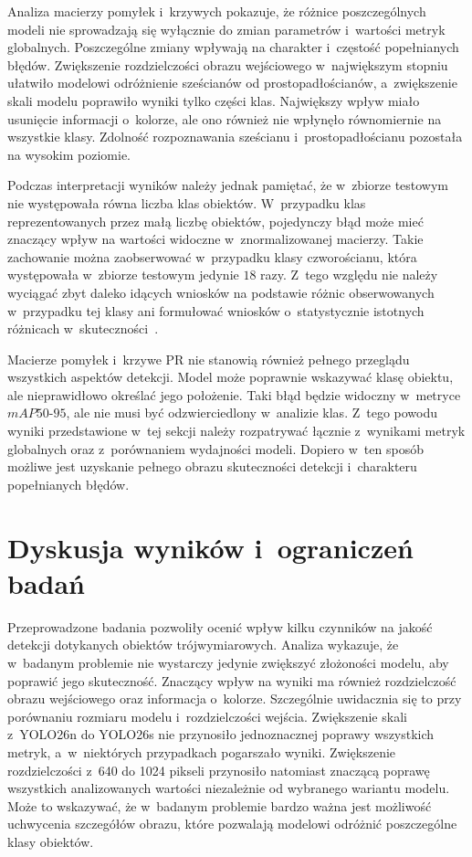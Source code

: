 Analiza macierzy pomyłek i~krzywych pokazuje, że różnice poszczególnych modeli nie sprowadzają się wyłącznie do zmian parametrów i~wartości metryk globalnych. Poszczególne zmiany wpływają na charakter i~częstość popełnianych błędów. Zwiększenie rozdzielczości obrazu wejściowego w~największym stopniu ułatwiło modelowi odróżnienie sześcianów od prostopadłościanów, a~zwiększenie skali modelu poprawiło wyniki tylko części klas. Największy wpływ miało usunięcie informacji o~kolorze, ale ono również nie wpłynęło równomiernie na wszystkie klasy. Zdolność rozpoznawania sześcianu i~prostopadłościanu pozostała na wysokim poziomie.

Podczas interpretacji wyników należy jednak pamiętać, że w~zbiorze testowym nie występowała równa liczba klas obiektów. W~przypadku klas reprezentowanych przez małą liczbę obiektów, pojedynczy błąd może mieć znaczący wpływ na wartości widoczne w~znormalizowanej macierzy. Takie zachowanie można zaobserwować w~przypadku klasy czworościanu, która występowała w~zbiorze testowym jedynie $18$ razy. Z~tego względu nie należy wyciągać zbyt daleko idących wniosków na podstawie różnic obserwowanych w~przypadku tej klasy ani formułować wniosków o~statystycznie istotnych różnicach w~skuteczności~.

Macierze pomyłek i~krzywe PR nie stanowią również pełnego przeglądu wszystkich aspektów detekcji. Model może poprawnie wskazywać klasę obiektu, ale nieprawidłowo określać jego położenie. Taki błąd będzie widoczny w~metryce $mAP50\text{-}95$, ale nie musi być odzwierciedlony w~analizie klas. Z~tego powodu wyniki przedstawione w~tej sekcji należy rozpatrywać łącznie z~wynikami metryk globalnych oraz z~porównaniem wydajności modeli. Dopiero w~ten sposób możliwe jest uzyskanie pełnego obrazu skuteczności detekcji i~charakteru popełnianych błędów.

\section{Dyskusja wyników i~ograniczeń badań}

Przeprowadzone badania pozwoliły ocenić wpływ kilku czynników na jakość detekcji dotykanych obiektów trójwymiarowych. Analiza wykazuje, że w~badanym problemie nie wystarczy jedynie zwiększyć złożoności modelu, aby poprawić jego skuteczność. Znaczący wpływ na wyniki ma również rozdzielczość obrazu wejściowego oraz informacja o~kolorze. Szczególnie uwidacznia się to przy porównaniu rozmiaru modelu i~rozdzielczości wejścia. Zwiększenie skali z~YOLO26n do YOLO26s nie przynosiło jednoznacznej poprawy wszystkich metryk, a~w~niektórych przypadkach pogarszało wyniki. Zwiększenie rozdzielczości z~640 do 1024 pikseli przynosiło natomiast znaczącą poprawę wszystkich analizowanych wartości niezależnie od wybranego wariantu modelu. Może to wskazywać, że w~badanym problemie bardzo ważna jest możliwość uchwycenia szczegółów obrazu, które pozwalają modelowi odróżnić poszczególne klasy obiektów.

